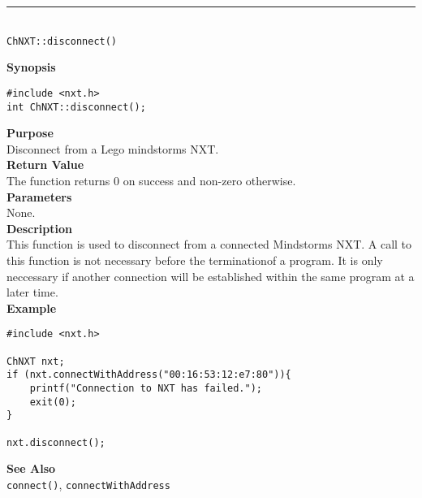 \noindent
\vspace{5pt}
\rule{4.5in}{0.015in}\\
\noindent
{\LARGE \texttt{ChNXT::disconnect()} }\\


\noindent
{\bf Synopsis}
\begin{lstlisting}
#include <nxt.h>
int ChNXT::disconnect();
\end{lstlisting}

\noindent
{\bf Purpose}\\
Disconnect from a Lego mindstorms NXT.\\

\noindent
{\bf Return Value}\\
The function returns 0 on success and non-zero otherwise.\\

\noindent
{\bf Parameters}\\
None.\\

\noindent
{\bf Description}\\
This function is used to disconnect from a connected Mindstorms NXT. A call to this function is not necessary before the terminationof a program. It is only neccessary if another connection will be established within the same program at a later time.\\

\noindent
{\bf Example}
\begin{lstlisting}
#include <nxt.h> 

ChNXT nxt;
if (nxt.connectWithAddress("00:16:53:12:e7:80")){
    printf("Connection to NXT has failed.");
    exit(0);
}
    
nxt.disconnect();
\end{lstlisting}

\noindent
{\bf See Also}\\
\texttt{connect()}, \texttt{connectWithAddress}\\
